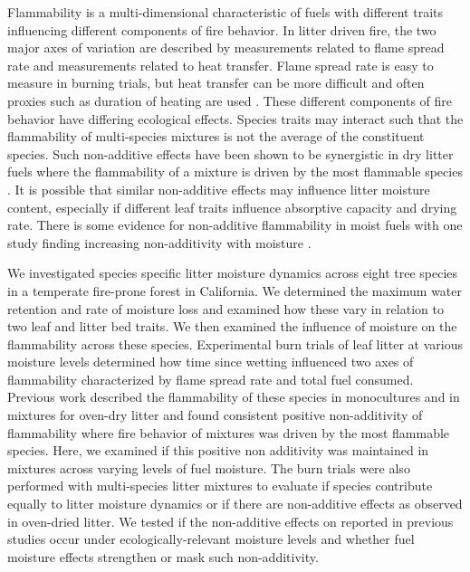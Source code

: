 \documentclass[letterpaper,12pt]{article}
\begin{document}
Flammability is a multi-dimensional characteristic of fuels
\citep{Schwilk-2015, Pausas+Keeley+etal-2017} with different traits influencing
different components of fire behavior. In litter driven fire, the two major
axes of variation are described by measurements related to flame spread rate
and measurements related to heat transfer. Flame spread rate is easy to measure
in burning trials, but heat transfer can be more difficult and often proxies
such as duration of heating are used \citep{Magalhaes+Schwilk-2012,
  Varner+Kane+etal-2015}. These different components of fire behavior have
differing ecological effects. Species traits may interact such that the
flammability of multi-species mixtures is not the average of the constituent
species. Such non-additive effects have been shown to be synergistic in dry
litter fuels where the flammability of a mixture is driven by the most
flammable species \citep{VanAltena+Logtestjin+etal-2012,
  Magalhaes+Schwilk-2012}. It is possible that similar non-additive effects may
influence litter moisture content, especially if different leaf traits
influence absorptive capacity and drying rate. There is some evidence for
non-additive flammability in moist fuels with one study finding increasing
non-additivity with moisture \citep{Blauw+Wensink+etal-2015}.

We investigated species specific litter moisture dynamics across eight tree
species in a temperate fire-prone forest in California. We determined the
maximum water retention and rate of moisture loss and examined how these vary
in relation to two leaf and litter bed traits. We then examined the influence
of moisture on the flammability across these species. Experimental burn trials
of leaf litter at various moisture levels determined how time since wetting
influenced two axes of flammability characterized by flame spread rate and
total fuel consumed. Previous work described the flammability of these species
in monocultures and in mixtures for oven-dry litter
\citep{Magalhaes+Schwilk-2012} and found consistent positive non-additivity of
flammability where fire behavior of mixtures was driven by the most flammable
species. Here, we examined if this positive non additivity was maintained in
mixtures across varying levels of fuel moisture. The burn trials were also
performed with multi-species litter mixtures to evaluate if species contribute
equally to litter moisture dynamics or if there are non-additive effects as
observed in oven-dried litter. We tested if the non-additive effects on
reported in previous studies occur under ecologically-relevant moisture levels
and whether fuel moisture effects strengthen or mask such non-additivity.
\end{document}
